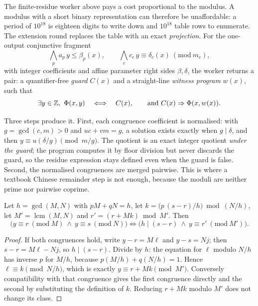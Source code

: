 The finite-residue worker above pays a cost proportional to the modulus. A
modulus with a short binary representation can therefore be unaffordable: a
period of $10^{18}$ is eighteen digits to write down and $10^{18}$ table rows to
enumerate. The extension round replaces the table with an exact
\emph{projection}. For the one-output conjunctive fragment
\[
 \bigwedge_p a_p\,y\le\beta_p(x),
 \qquad
 \bigwedge_c c_c\,y\equiv\delta_c(x)\ (\mathrm{mod}\ m_c),
\]
with integer coefficients and affine parameter right sides $\beta,\delta$, the
worker returns a pair: a quantifier-free \emph{guard} $C(x)$ and a
straight-line \emph{witness program} $w(x)$, such that
\[
 \exists y\in\mathbb{Z},\ \Phi(x,y)
 \quad\Longleftrightarrow\quad
 C(x),
 \qquad\text{and } C(x)\Rightarrow\Phi(x,w(x)).
\]

Three steps produce it. First, each congruence coefficient is normalised: with
$g=\gcd(c,m)>0$ and $uc+vm=g$, a solution exists exactly when $g\mid\delta$, and
then $y\equiv u(\delta/g)\pmod{m/g}$. The quotient is an exact integer quotient
\emph{under the guard}; the program computes it by floor division but never
discards the guard, so the residue expression stays defined even when the guard
is false. Second, the normalised congruences are merged pairwise. This is where
a textbook Chinese remainder step is not enough, because the moduli are neither
prime nor pairwise coprime.

\begin{lemma}\label{lem:crt}
Let $h=\gcd(M,N)$ with $pM+qN=h$, let
$k=\bigl(p\,(s-r)/h\bigr)\bmod (N/h)$, let $M'=\operatorname{lcm}(M,N)$ and
$r'=(r+Mk)\bmod M'$. Then
\[
 \bigl(y\equiv r\ (\mathrm{mod}\ M)\ \wedge\ y\equiv s\ (\mathrm{mod}\ N)\bigr)
 \iff
 \bigl(h\mid (s-r)\ \wedge\ y\equiv r'\ (\mathrm{mod}\ M')\bigr).
\]
\end{lemma}

\begin{proof}
If both congruences hold, write $y-r=M\ell$ and $y-s=Nj$; then
$s-r=M\ell-Nj$, so $h\mid(s-r)$. Divide by $h$: the equation for $\ell$ modulo
$N/h$ has inverse $p$ for $M/h$, because $p(M/h)+q(N/h)=1$. Hence
$\ell\equiv k\pmod{N/h}$, which is exactly $y\equiv r+Mk\pmod{M'}$. Conversely
compatibility with that congruence gives the first congruence directly and the
second by substituting the definition of $k$. Reducing $r+Mk$ modulo $M'$ does
not change its class.
\end{proof}

